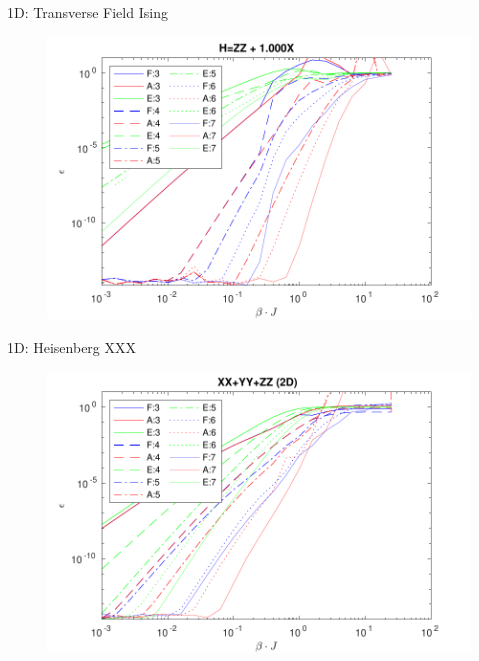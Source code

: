 \begin{frame}{1D: Transverse Field Ising}

    \begin{figure}
        \center
        \includegraphics[height=\textheight]{../Figuren/benchmarking/t_ising.pdf}
    \end{figure}

\end{frame}

\begin{frame}{1D: Heisenberg XXX}

    \begin{figure}
        \center
        \includegraphics[height=\textheight]{../Figuren/benchmarking/t_heis_XXX.pdf}
    \end{figure}

\end{frame}

